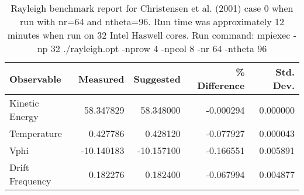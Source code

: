 \begin{table}
\centering
\begin{tabular} {| l | r | r | r | r |}
\hline
   Observable      &    Measured    & Suggested   & \% Difference &  Std. Dev. \\
\hline
   Kinetic Energy  &     58.347829  &   58.348000  &   -0.000294  &    0.000000 \\
   Temperature     &      0.427786  &    0.428120  &   -0.077927  &    0.000043 \\
   Vphi            &    -10.140183  &  -10.157100  &   -0.166551  &    0.005891 \\
   Drift Frequency &      0.182276  &    0.182400  &   -0.067994  &    0.004877 \\
\hline
\end{tabular}
\caption{\label{table:bench_high} Rayleigh benchmark report for Christensen et al. (2001) case 0 when run with nr=64 and ntheta=96.  Run time was approximately 12 minutes when run on 32 Intel Haswell cores.
\newline
Run command:  mpiexec -np 32 ./rayleigh.opt -nprow 4 -npcol 8 -nr 64 -ntheta 96 }
\end{table}
